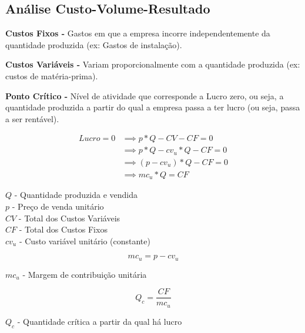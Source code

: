 \documentclass[11pt]{article}
\begin{document}
\subsection{Análise Custo-Volume-Resultado}

\textbf{Custos Fixos -} Gastos em que a empresa incorre independentemente da quantidade produzida (ex: Gastos de instalação).

\textbf{Custos Variáveis -} Variam proporcionalmente com a quantidade produzida (ex: custos de matéria-prima).

\textbf{Ponto Crítico -} Nível de atividade que corresponde a Lucro zero, ou seja, a quantidade produzida a partir do qual a empresa passa a ter lucro (ou seja, passa a ser rentável).

\begin{minipage}[b]{0.5\textwidth}
    \begin{align*}
        Lucro = 0 & \implies p * Q - CV - CF = 0       \\
                  & \implies p * Q - cv_u * Q - CF = 0 \\
                  & \implies (p - cv_u) * Q - CF = 0   \\
                  & \implies mc_u * Q = CF
    \end{align*}
\end{minipage}
\begin{minipage}[b]{0.49\textwidth}
    $Q$ - Quantidade produzida e vendida         \\
    $p$ - Preço de venda unitário                \\
    $CV$ - Total dos Custos Variáveis            \\
    $CF$ - Total dos Custos Fixos                \\
    $cv_u$ - Custo variável unitário (constante)
\end{minipage}

\vspace{10pt}

\begin{minipage}{0.5\textwidth}
    \begin{equation*}
        mc_u = p - cv_u
    \end{equation*}
\end{minipage}
\begin{minipage}{0.49\textwidth}
    $mc_u$ - Margem de contribuição unitária
\end{minipage}

\begin{minipage}{0.5\textwidth}
    \begin{equation*}
        Q_c = \frac{CF}{mc_u}
    \end{equation*}
\end{minipage}
\begin{minipage}{0.49\textwidth}
    $Q_c$ - Quantidade crítica a partir da qual há lucro
\end{minipage}
\end{document}
